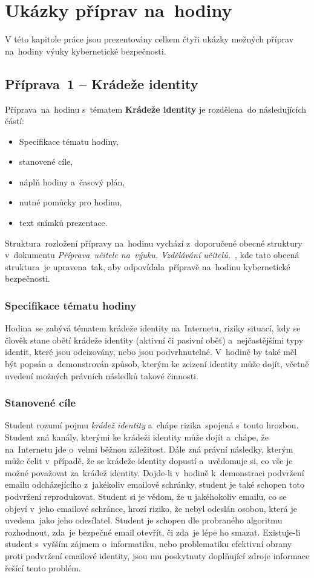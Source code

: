 \documentclass[a4paper, 12pt]{article}
\begin{document}
\newpage
\section{Ukázky příprav na~hodiny}
V této kapitole práce jsou prezentovány celkem čtyři ukázky možných příprav na~hodiny výuky kybernetické bezpečnosti.

\subsection{Příprava~1 -- Krádeže identity}
Příprava~na~hodinu s~tématem \textbf{Krádeže identity} je rozdělena~do následujících částí:
    \begin{itemize}
        \setlength{\itemsep}{-3pt}
        \item Specifikace tématu hodiny,
        \item stanovené cíle,
        \item náplň hodiny a~časový plán,
        \item nutné pomůcky pro hodinu,
        \item text snímků prezentace.
    \end{itemize}

Struktura~rozložení přípravy na~hodinu vychází z~doporučené obecné struktury v~dokumentu \textit{Příprava~učitele na~výuku. Vzdělávání učitelů.}~\cite{presentationPavlaZ}, kde tato obecná struktura~je upravena~tak, aby odpovídala~přípravě na~hodinu kybernetické bezpečnosti.

\subsubsection{Specifikace tématu hodiny}
Hodina~se zabývá tématem krádeže identity na~Internetu, riziky situací, kdy se člověk stane obětí krádeže identity (aktivní či pasivní oběť) a~nejčastějšími typy identit, které jsou odcizovány, nebo jsou podvrhnutelné. V~hodině by také měl být popsán a~demonstrován způsob, kterým ke zcizení identity může dojít, včetně uvedení možných právních následků takové činnosti.

\subsubsection{Stanovené cíle}
Student rozumí pojmu \textit{krádež identity} a~chápe rizika~spojená s~touto hrozbou. Student zná kanály, kterými ke krádeži identity může dojít a~chápe, že na~Internetu jde o~velmi běžnou záležitost. Dále zná právní následky, kterým může čelit v~případě, že se krádeže identity dopustí a~uvědomuje si, co vše je možné považovat za~krádež identity. Dojde-li v~hodině k~demonstraci podvržení emailu odcházejícího z~jakékoliv emailové schránky, student je také schopen toto podvržení reprodukovat. Student si je vědom, že u jakéhokoliv emailu, co se objeví v~jeho emailové schránce, hrozí riziko, že nebyl odeslán osobou, která je uvedena~jako jeho odesílatel. Student je schopen dle probraného algoritmu rozhodnout, zda~je bezpečné email otevřít, či zda~je lépe ho smazat. Existuje-li student s~vyšším zájmem o~informatiku, nebo problematiku efektivní obrany proti podvržení emailové identity, jsou mu poskytnuty doplňující zdroje informace řešící tento problém.
\end{document}
